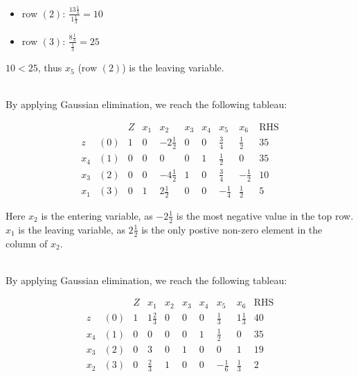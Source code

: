 \documentclass[12pt]{article}
\begin{document}
\begin{itemize}
  \item row $(2)$: $\frac{13\frac{1}{3}}{1\frac{1}{3}} = 10$
  \item row $(3)$: $\frac{8\frac{1}{3}}{\frac{1}{3}} = 25$
\end{itemize}

\noindent
$10 < 25$, thus $x_5$ (row $(2)$) is the leaving variable.

\noindent
\\
By applying Gaussian elimination, we reach the following tableau:

\newpage
\begin{equation*}
  \begin{array}{cc|r|rrrrrr|c}
            &     & Z & x_1 &           x_2 & x_3 & x_4 &          x_5 &          x_6 & \text{RHS} \\ \hline
        z   & (0) & 1 &   0 & -2\frac{1}{2} &   0 &   0 &  \frac{3}{4} &  \frac{1}{2} & 35 \\
        x_4 & (1) & 0 &   0 &             0 &   0 &   1 &  \frac{1}{2} &            0 & 35 \\
        x_3 & (2) & 0 &   0 & -4\frac{1}{2} &   1 &   0 &  \frac{3}{4} & -\frac{1}{2} & 10 \\
        x_1 & (3) & 0 &   1 &  2\frac{1}{2} &   0 &   0 & -\frac{1}{4} &  \frac{1}{2} & 5
  \end{array}
\end{equation*}

\noindent
Here $x_2$ is the entering variable, as $-2\frac{1}{2}$ is the most negative value in the top row.
$x_1$ is the leaving variable, as $2\frac{1}{2}$ is the only postive non-zero element in the column of $x_2$.

\noindent
\\
By applying Gaussian elimination, we reach the following tableau:

\begin{equation*}
  \begin{array}{cc|r|rrrrrr|c}
            &     & Z &          x_1 & x_2 & x_3 & x_4 &          x_5 &          x_6 & \text{RHS} \\ \hline
        z   & (0) & 1 & 1\frac{2}{3} &   0 &   0 &   0 &  \frac{1}{3} & 1\frac{1}{3} & 40 \\
        x_4 & (1) & 0 &            0 &   0 &   0 &   1 &  \frac{1}{2} &            0 & 35 \\
        x_3 & (2) & 0 &            3 &   0 &   1 &   0 &            0 &            1 & 19 \\
        x_2 & (3) & 0 &  \frac{2}{3} &   1 &   0 &   0 & -\frac{1}{6} &  \frac{1}{3} & 2
  \end{array}
\end{equation*}
\end{document}
